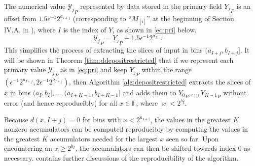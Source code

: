 \documentclass[12pt]{article}
\providecommand{\F}{\ensuremath{\mathbb{F}}}
\theoremstyle{definition}
\numberwithin{equation}{section}
\numberwithin{figure}{section}
\begin{document}
      The numerical value ${\mathcal{Y}_j}_P$ represented by data stored in the primary field ${Y_j}_P$ is an offset from $1.5\epsilon^{-1}2^{a_{I + j}}$ (corresponding to ``$M_{[i]}$'' at the beginning of Section IV.A. in \cite{repsum}), where $I$ is the index of $Y$, as shown in  \eqref{eq:pri} below.
      \begin{equation}
        {\mathcal{Y}_j}_P = {Y_j}_P - 1.5\epsilon^{-1}2^{a_{I + j}}
        \label{eq:pri}
      \end{equation}
      This simplifies the process of extracting the slices of input in bins $(a_{I + j}, b_{I + j}]$. It will be shown in Theorem \ref{thm:ddepositrestricted} that if we represent each primary value ${\mathcal{Y}_j}_P$ as in \eqref{eq:pri} and keep ${Y_j}_P$ within the range $(\epsilon^{-1} 2^{a_{I + j}}, 2 \epsilon^{-1} 2^{a_{I + j}})$, then Algorithm \ref{alg:depositrestricted} extracts the slices of $x$ in bins $(a_I, b_I], ..., (a_{I + K - 1}, b_{I + K - 1}]$ and adds them to ${Y_0}_P, ..., {Y_{K - 1}}_P$ without error (and hence reproducibly) for all $x \in \F$, where $|x| < 2^{b_I}$.

      Because $d(x, I + j) = 0$ for bins with $x < 2^{a_{I + j}}$, the values in the greatest $K$ nonzero accumulators can be computed reproducibly by computing the values in the greatest $K$ accumulators needed for the largest $x$ seen so far. Upon encountering an $x \geq 2^{b_I}$, the accumulators can then be shifted towards index $0$ as necessary. \cite{repsum} contains further discussions of the reproducibility of the algorithm.
\end{document}
